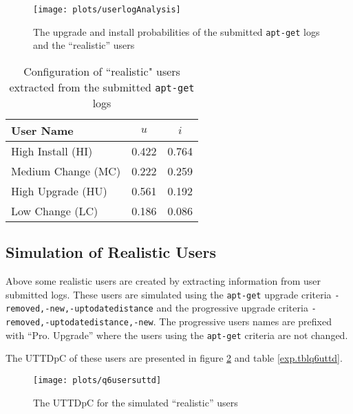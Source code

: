 \begin{figure}[htp]
\begin{center}
  \texttt{[image: plots/userlogAnalysis]}
  \caption{The upgrade and install probabilities of the submitted \texttt{apt-get} logs and the ``realistic'' users}
  \label{exp.figuserlogs}
\end{center}
\end{figure}

\begin{table}[h!]
\centering
\begin{tabular}{|l | c | c | }
\hline
User Name 				& 	$u$ 		& $i$ 		\\ \hline
High Install (HI)			& 0.422			& 0.764 	\\
Medium Change (MC)			& 0.222			& 0.259 	\\
High Upgrade (HU)			& 0.561			& 0.192		\\
Low Change 	(LC)			& 0.186			& 0.086 	\\ \hline
\end{tabular}
\caption{Configuration of ``realistic" users extracted from the submitted \texttt{apt-get} logs}
\label{exp.tbluserlogs}
\end{table}

\subsection{Simulation of Realistic Users}
\label{exp.q4}
Above some realistic users are created by extracting information from user submitted logs.
These users are simulated using the \texttt{apt-get} upgrade criteria \texttt{-removed,-new,-uptodatedistance} and the progressive upgrade criteria \texttt{-removed,-uptodatedistance,-new}.
The progressive users names are prefixed  with ``Pro. Upgrade'' where the users using the \texttt{apt-get} criteria are not changed.

The UTTDpC of these users are presented in figure \ref{exp.q6uttdpc} and table \ref{exp.tblq6uttd}.
\begin{figure}[htp]
\begin{center}
  \texttt{[image: plots/q6usersuttd]}
  \caption{The UTTDpC for the simulated ``realistic'' users}
  \label{exp.q6uttdpc}
\end{center}
\end{figure}

